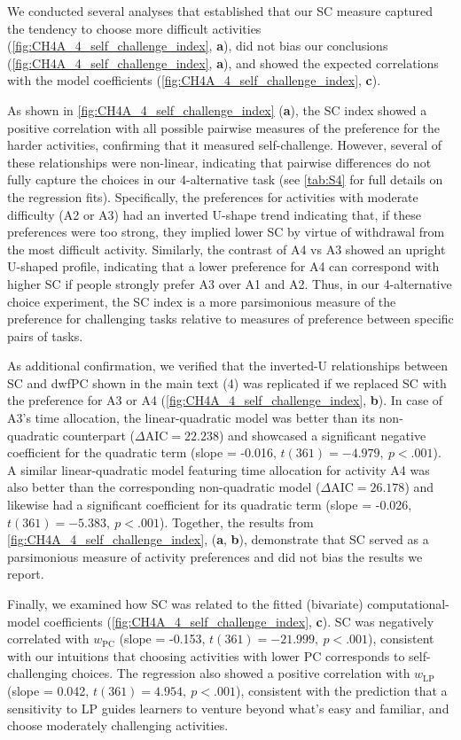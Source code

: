 \begin{subappendices}
We conducted several analyses that established that our SC measure captured the tendency to choose more difficult activities (\cref{fig:CH4A_4_self_challenge_index}, \textbf{a}), did not bias our conclusions (\cref{fig:CH4A_4_self_challenge_index}, \textbf{a}), and showed the expected correlations with the model coefficients (\cref{fig:CH4A_4_self_challenge_index}, \textbf{c}).

As shown in \cref{fig:CH4A_4_self_challenge_index} (\textbf{a}), the SC index showed a positive correlation with all possible pairwise measures of the preference for the harder activities, confirming that it measured self-challenge. However, several of these relationships were non-linear, indicating that pairwise differences do not fully capture the choices in our 4-alternative task (see \cref{tab:S4} for full details on the regression fits). Specifically, the preferences for activities with moderate difficulty (A2 or A3) had an inverted U-shape trend indicating that, if these preferences were too strong, they implied lower SC by virtue of withdrawal from the most difficult activity. Similarly, the contrast of A4 vs A3 showed an upright U-shaped profile, indicating that a lower preference for A4 can correspond with higher SC if people strongly prefer A3 over A1 and A2. Thus, in our 4-alternative choice experiment, the SC index is a more parsimonious measure of the preference for challenging tasks relative to measures of preference between specific pairs of tasks.

As additional confirmation, we verified that the inverted-U relationships between SC and \ac{dwfPC} shown in the main text (4) was replicated if we replaced SC with the preference for A3 or A4 (\cref{fig:CH4A_4_self_challenge_index}, \textbf{b}). In case of A3’s time allocation, the linear-quadratic model was better than its non-quadratic counterpart ($\Delta \mathrm{AIC} = 22.238$) and showcased a significant negative coefficient for the quadratic term (slope = -0.016, $t(361) = -4.979,\ p <.001$). A similar linear-quadratic model featuring time allocation for activity A4 was also better than the corresponding non-quadratic model ($\Delta \mathrm{AIC} = 26.178$) and likewise had a significant coefficient for its quadratic term (slope = -0.026, $t(361) = -5.383,\ p < .001$). Together, the results from \cref{fig:CH4A_4_self_challenge_index}, (\textbf{a}, \textbf{b}), demonstrate that SC served as a parsimonious measure of activity preferences and did not bias the results we report.

Finally, we examined how SC was related to the fitted (bivariate) computational-model coefficients (\cref{fig:CH4A_4_self_challenge_index}, \textbf{c}). SC was negatively correlated with $w_\mathrm{PC}$ (slope = -0.153, $t(361) = -21.999,\ p < .001$), consistent with our intuitions that choosing activities with lower \ac{PC} corresponds to self-challenging choices. The regression also showed a positive correlation with $w_\mathrm{LP}$ (slope = 0.042, $t(361) = 4.954,\ p < .001$), consistent with the prediction that a sensitivity to \ac{LP} guides learners to venture beyond what’s easy and familiar, and choose moderately challenging activities.



\end{subappendices}
